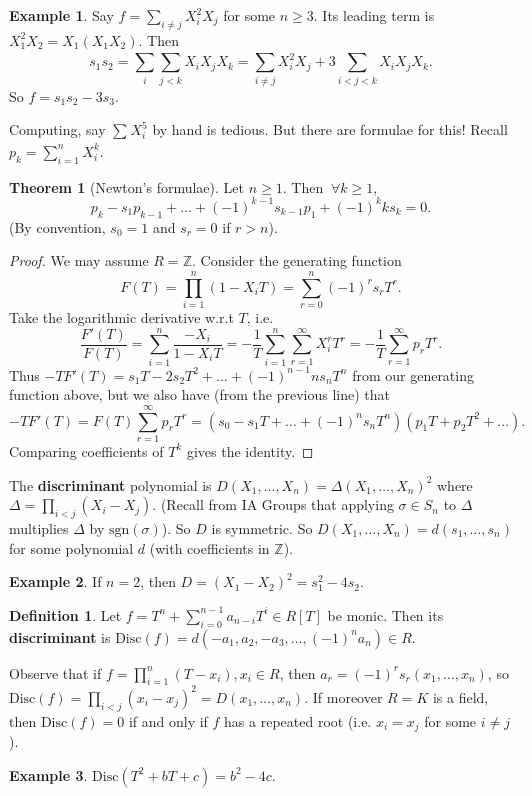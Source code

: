 \documentclass{article}
\theoremstyle{definition}
\newtheorem{theorem}{Theorem}[section]
\newtheorem{example}{Example}[section]
\newtheorem{defn}{Definition}[section]
\begin{document}
\begin{example}
    Say $f = \sum_{i \neq j} X_i^2 X_j$ for some $n \ge 3$. Its leading term is ${X_1^2X_2 = X_1(X_1X_2)}$. Then $$s_1s_2 = \sum_{i}^{} \sum_{j<k}^{} X_iX_jX_k = \sum_{i \neq j}^{} X_i^2 X_j + 3 \sum_{i<j<k}^{} X_iX_jX_k.$$
    So $f = s_1s_2 - 3s_3$.
\end{example}

Computing, say $\sum_{}^{} X_i^5$ by hand is tedious. But there are formulae for this! Recall $p_k = \sum_{i=1}^{n} X_i^k$.

\begin{theorem}[Newton's formulae]
    Let $n\ge 1$. Then $~\forall k \ge 1$, $$p_k - s_1p_{k-1} + \ldots + (-1)^{k-1}s_{k-1}p_1 + (-1)^k k s_k = 0.$$
    (By convention, $s_0 = 1$ and $s_r = 0$ if $r>n$).
\end{theorem}
\begin{proof}
    We may assume $R = \mathbb{Z}$. Consider the generating function \[
    F(T) = \prod_{i=1}^{n} (1-X_iT) = \sum_{r=0}^{n} (-1)^r s_r T^r.
    \]
    Take the logarithmic derivative w.r.t $T$, i.e. \[
    \frac{F'(T)}{F(T)} = \sum_{i=1}^{n} \frac{-X_i}{1-X_iT} = -\frac{1}{T} \sum_{i=1}^{n} \sum_{r=1}^{\infty} X_i^r T^r = -\frac{1}{T} \sum_{r=1}^{\infty} p_r T^r.
    \]
    Thus $-TF'(T) = s_1T - 2s_2T^2 + \ldots + (-1)^{n-1}ns_nT^n$ from our generating function above, but we also have (from the previous line) that $$-TF'(T) = F(T)\sum_{r=1}^{\infty} p_r T^r = (s_0 - s_1T + \ldots + (-1)^n s_n T^n)(p_1 T + p_2 T^2 + \ldots).$$
    Comparing coefficients of $T^k$ gives the identity.
\end{proof}

The \textbf{discriminant} polynomial is $D(X_1,\ldots,X_n) = \Delta(X_1,\ldots,X_n)^2$ where $\Delta = \prod_{i<j} (X_i-X_j)$. (Recall from IA Groups that applying $\sigma \in S_n$ to $\Delta$ multiplies $\Delta$ by $\text{sgn}(\sigma)$). So $D$ is symmetric. So $D(X_1,\ldots,X_n) = d(s_1,\ldots,s_n)$ for some polynomial $d$ (with coefficients in $\mathbb{Z}$).
\begin{example}
    If $n=2$, then $D = (X_1 - X_2)^2 = s_1^2 - 4s_2$.
\end{example}
\begin{defn}
    Let $f =T^n + \sum_{i=0}^{n-1} a_{n-i}T^i \in R[T]$ be monic. Then its \textbf{discriminant} is $\text{Disc}(f) = d(-a_1,a_2,-a_3,\ldots,(-1)^n a_n) \in R$.
\end{defn}
Observe that if $f = \prod_{i=1}^{n} (T-x_i), x_i \in R$, then $a_r = (-1)^r s_r(x_1,\ldots,x_n)$, so $\text{Disc}(f) = \prod_{i<j}^{} (x_i-x_j)^2 = D(x_1,\ldots,x_n)$. If moreover $R = K$ is a field, then $\text{Disc}(f) = 0$ if and only if $f$ has a repeated root (i.e. $x_i=x_j$ for some $i \neq j$).
\begin{example}
    $\text{Disc}(T^2+bT+c) = b^2 - 4c$.
\end{example}
\end{document}
